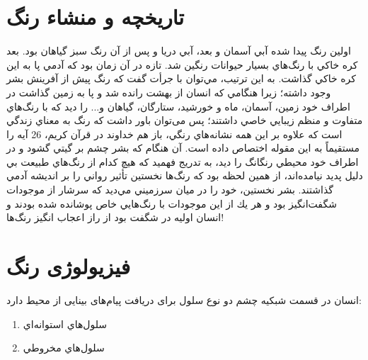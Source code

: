 \documentclass[12pt]{report}
\begin{document}
\section{تاريخچه و منشاء رنگ }
اولين رنگ پيدا شده آبي آسمان و بعد، آبي دريا و پس از آن رنگ سبز گياهان بود. بعد كره خاكي با رنگ‌هاي بسيار حيوانات رنگین شد. تازه در آن زمان بود كه آدمي پا به اين كره خاكي گذاشت. به اين ترتيب، مي‌توان با جرأت گفت كه رنگ پيش از آفرينش بشر وجود داشته؛ زيرا هنگامي كه انسان از بهشت رانده شد و پا به زمين گذاشت در اطراف خود زمين، آسمان، ماه و خورشيد، ستارگان، گياهان و... را ديد كه با رنگ‌هاي متفاوت و منظم زيبايي خاصي داشتند؛ پس می‌توان باور داشت که رنگ به معناي زندگي است كه علاوه بر اين همه نشانه‌هاي رنگي، باز هم خداوند در قرآن كريم، 26 آيه را مستقيماً به اين مقوله اختصاص داده است. 
آن هنگام كه بشر چشم بر گيتي گشود و در اطراف خود محيطي رنگانگ را دید، به تدريج فهمید كه هيچ كدام از رنگ‌هاي طبيعت بي دليل پديد نيامده‌اند، از همين لحظه بود كه رنگ‌ها نخستين تأثير رواني را بر انديشه آدمي گذاشتند. بشر نخستين، خود را در ميان سرزميني مي‌ديد كه سرشار از موجودات شگفت‌انگيز بود و هر يك از اين موجودات با رنگ‌هايي خاص پوشانده شده بودند و انسان اوليه در شگفت بود از راز اعجاب انگيز رنگ‌ها!

\section{فیزیولوژی رنگ }
انسان در قسمت شبكيه چشم دو نوع سلول برای دریافت پیام‌های بینایی از محیط دارد:

\begin{enumerate}
\item سلول‌هاي استوانه‌اي
\item سلول‌هاي مخروطي
\end{enumerate}
\end{document}
